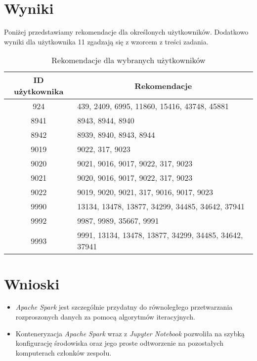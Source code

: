 \documentclass{classrep}
\begin{document}
\section{Wyniki}
Poniżej przedstawiamy rekomendacje dla określonych użytkowników. Dodatkowo wyniki dla użytkownika 11 zgadzają się z wzorcem z treści zadania.

\begin{table}[H]
\centering
\caption{Rekomendacje dla wybranych użytkowników}
\label{tab:res1}
\begin{tabular}{|c|l|}
\hline
\textbf{ID użytkownika} & \multicolumn{1}{c|}{\textbf{Rekomendacje}}      \\ \hline
924                     & 439, 2409, 6995, 11860, 15416, 43748, 45881     \\ \hline
8941                    & 8943, 8944, 8940                                \\ \hline
8942                    & 8939, 8940, 8943, 8944                          \\ \hline
9019                    & 9022, 317, 9023                                 \\ \hline
9020                    & 9021, 9016, 9017, 9022, 317, 9023               \\ \hline
9021                    & 9020, 9016, 9017, 9022, 317, 9023               \\ \hline
9022                    & 9019, 9020, 9021, 317, 9016, 9017, 9023         \\ \hline
9990                    & 13134, 13478, 13877, 34299, 34485, 34642, 37941 \\ \hline
9992                    & 9987, 9989, 35667, 9991                         \\ \hline
9993                    & 9991, 13134, 13478, 13877, 34299, 34485, 34642, 37941 \\ \hline
\end{tabular}
\end{table}

\section{Wnioski}

\begin{itemize}
    \item \textit{Apache Spark} jest szczególnie przydatny do równoległego przetwarzania rozproszonych danych za pomocą algorytmów iteracyjnych.\\
    \item Konteneryzacja \textit{Apache Spark} wraz z \textit{Jupyter Notebook} pozwoliła na szybką konfigurację środowiska oraz jego proste odtworzenie na pozostałych komputerach członków zespołu.

\end{itemize}
\end{document}
